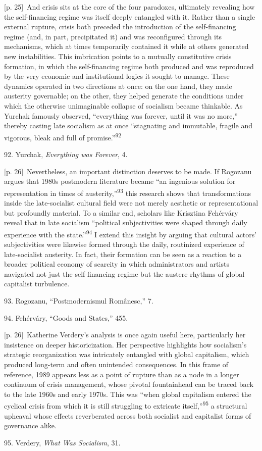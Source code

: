 \documentclass[10pt,a4paper]{article}
\begin{document}
{\scriptsize\color{gray} [p. 25]}\ And crisis sits at the core of the four paradoxes, ultimately revealing how the self-financing regime was itself deeply entangled with it. Rather than a single external rupture, crisis both preceded the introduction of the self-financing regime (and, in part, precipitated it) and was reconfigured through its mechanisms, which at times temporarily contained it while at others generated new instabilities. This imbrication points to a mutually constitutive crisis formation, in which the self-financing regime both produced and was reproduced by the very economic and institutional logics it sought to manage. These dynamics operated in two directions at once: on the one hand, they made austerity governable; on the other, they helped generate the conditions under which the otherwise unimaginable collapse of socialism became thinkable. As Yurchak famously observed, “everything was forever, until it was no more,” thereby casting late socialism as at once “stagnating and immutable, fragile and vigorous, bleak and full of promise.”\nobreak\textsuperscript{92}\par{\small 92. Yurchak, \textit{Everything was Forever}, 4.\par}
{\scriptsize\color{gray} [p. 26]}\ Nevertheless, an important distinction deserves to be made. If Rogozanu argues that 1980s postmodern literature became “an ingenious solution for representation in times of austerity,”\nobreak\textsuperscript{93} this research shows that transformations inside the late-socialist cultural field were not merely aesthetic or representational but profoundly material. To a similar end, scholars like Krisztina Fehérváry reveal that in late socialism “political subjectivities were shaped through daily experience with the state.”\nobreak\textsuperscript{94} I extend this insight by arguing that cultural actors’ subjectivities were likewise formed through the daily, routinized experience of late-socialist austerity. In fact, their formation can be seen as a reaction to a broader political economy of scarcity in which administrators and artists navigated not just the self-financing regime but the austere rhythms of global capitalist turbulence.\par{\small 93. Rogozanu, “Postmodernismul Românesc,” 7.\par}{\small 94. Fehérváry, “Goods and States,” 455.\par}
{\scriptsize\color{gray} [p. 26]}\ Katherine Verdery’s analysis is once again useful here, particularly her insistence on deeper historicization. Her perspective highlights how socialism’s strategic reorganization was intricately entangled with global capitalism, which produced long-term and often unintended consequences. In this frame of reference, 1989 appears less as a point of rupture than as a node in a longer continuum of crisis management, whose pivotal fountainhead can be traced back to the late 1960s and early 1970s. This was “when global capitalism entered the cyclical crisis from which it is still struggling to extricate itself,”\nobreak\textsuperscript{95} a structural upheaval whose effects reverberated across both socialist and capitalist forms of governance alike.\par{\small 95. Verdery, \textit{What Was Socialism}, 31.\par}
\end{document}
